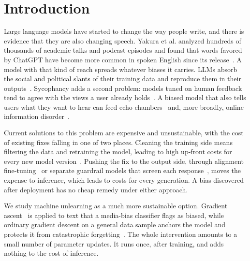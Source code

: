 \documentclass[runningheads]{llncs}
\begin{document}
\section{Introduction}

Large language models have started to change the way people write, and there is evidence that they are also changing speech. Yakura et al.
analyzed hundreds of thousands of academic talks and podcast episodes and
found that words favored by ChatGPT have become more common in spoken
English since its release~\cite{yakura2024empirical}. A model with that
kind of reach spreads whatever biases it carries. LLMs absorb the social
and political slants of their training data and reproduce them in their
outputs~\cite{gallegos2024bias,feng2023pretraining}. Sycophancy adds a
second problem: models tuned on human feedback tend to agree with the
views a user already holds~\cite{sharma2023sycophancy}. A biased model
that also tells users what they want to hear can feed echo
chambers~\cite{cinelli2021echo} and, more broadly, online information
disorder~\cite{wardle2017information}.

Current solutions to this problem are expensive and unsustainable, with the cost of existing fixes falling in one of two places. Cleaning the
training side means filtering the data and retraining the model, leading to high up-front costs for every new model version~\cite{strubell2019energy,patterson2021carbon,bender2021dangers}.
Pushing the fix to the output side, through alignment
fine-tuning~\cite{ouyang2022training} or separate guardrail models that
screen each response~\cite{inan2023llamaguard}, moves the expense to
inference, which leads to costs for every generation. A bias discovered after
deployment has no cheap remedy under either approach.

We study machine unlearning as a much more sustainable option. Gradient
ascent~\cite{jang2023knowledge,yao2024large} is applied to text that a
media-bias classifier flags as biased, while ordinary gradient descent on
a general data sample anchors the model and protects it from catastrophic
forgetting~\cite{kirkpatrick2017overcoming}. The whole intervention
amounts to a small number of parameter updates. It runs once, after
training, and adds nothing to the cost of inference.
\end{document}
